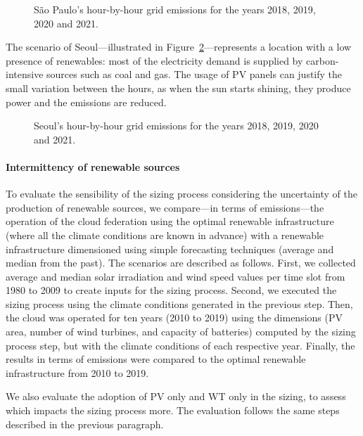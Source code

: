 \begin{figure}[h]
  \centering
  {}
  \caption{São Paulo's hour-by-hour grid emissions for the years 2018, 2019, 2020 and 2021.}
  \label{fig:co2_sp}
\end{figure}

The scenario of Seoul---illustrated in Figure~\ref{fig:co2_seoul}---represents a location with a low presence of renewables: most of the electricity demand is supplied by carbon-intensive sources such as coal and gas. The usage of PV panels can justify the small variation between the hours, as when the sun starts shining, they produce power and the emissions are reduced.

\begin{figure}[h]
  \centering
  {}
  \caption{Seoul's hour-by-hour grid emissions for the years 2018, 2019, 2020 and 2021.}
  \label{fig:co2_seoul}
\end{figure}

\paragraph{Intermittency of renewable sources}

To evaluate the sensibility of the sizing process considering the uncertainty of the production of renewable sources, we compare---in terms of  emissions---the operation of the cloud federation using the optimal renewable infrastructure (where all the climate conditions are known in advance) with a renewable infrastructure dimensioned using simple forecasting techniques (average and median from the past). The scenarios are described as follows. First, we collected average and median solar irradiation and wind speed values per time slot from 1980 to 2009 to create inputs for the sizing process. Second, we executed the sizing process using the climate conditions generated in the previous step. Then, the cloud was operated for ten years (2010 to 2019) using the dimensions (PV area, number of wind turbines, and capacity of batteries) computed by the sizing process step, but with the climate conditions of each respective year. Finally, the results in terms of  emissions were compared to the optimal renewable infrastructure from 2010 to 2019.

We also evaluate the adoption of PV only and WT only in the sizing, to assess which impacts the sizing process more. The evaluation follows the same steps described in the previous paragraph.

